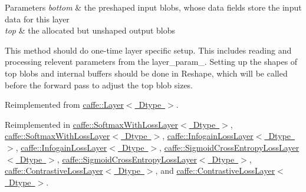 \begin{DoxyParams}{Parameters}
{\em bottom} & the preshaped input blobs, whose data fields store the input data for this layer \\
\hline
{\em top} & the allocated but unshaped output blobs\\
\hline
\end{DoxyParams}
This method should do one-\/time layer specific setup. This includes reading and processing relevent parameters from the {\ttfamily layer\+\_\+param\+\_\+}. Setting up the shapes of top blobs and internal buffers should be done in {\ttfamily Reshape}, which will be called before the forward pass to adjust the top blob sizes. 

Reimplemented from \mbox{\hyperlink{classcaffe_1_1_layer_a481323a3e0972c682787f2137468c29f}{caffe\+::\+Layer$<$ Dtype $>$}}.



Reimplemented in \mbox{\hyperlink{classcaffe_1_1_softmax_with_loss_layer_a96cd04896d4b805fcaf36c2c6522ae10}{caffe\+::\+Softmax\+With\+Loss\+Layer$<$ Dtype $>$}}, \mbox{\hyperlink{classcaffe_1_1_softmax_with_loss_layer_a2a3985570178431a4cc3f9b9fd4378c2}{caffe\+::\+Softmax\+With\+Loss\+Layer$<$ Dtype $>$}}, \mbox{\hyperlink{classcaffe_1_1_infogain_loss_layer_a772be3f4074c72b3cf9214bda3422402}{caffe\+::\+Infogain\+Loss\+Layer$<$ Dtype $>$}}, \mbox{\hyperlink{classcaffe_1_1_infogain_loss_layer_ae59c01de80f22c87c1dd2ef87c6e6a2f}{caffe\+::\+Infogain\+Loss\+Layer$<$ Dtype $>$}}, \mbox{\hyperlink{classcaffe_1_1_sigmoid_cross_entropy_loss_layer_aa1535140dd4eb94557c3afc89076d56d}{caffe\+::\+Sigmoid\+Cross\+Entropy\+Loss\+Layer$<$ Dtype $>$}}, \mbox{\hyperlink{classcaffe_1_1_sigmoid_cross_entropy_loss_layer_ac67af0cc1033db08d47a3f56aff5d600}{caffe\+::\+Sigmoid\+Cross\+Entropy\+Loss\+Layer$<$ Dtype $>$}}, \mbox{\hyperlink{classcaffe_1_1_contrastive_loss_layer_a943e67e7bb9c2362ec20ce44c777beac}{caffe\+::\+Contrastive\+Loss\+Layer$<$ Dtype $>$}}, and \mbox{\hyperlink{classcaffe_1_1_contrastive_loss_layer_a957623c05cb2289cd2ae9e9e93b48969}{caffe\+::\+Contrastive\+Loss\+Layer$<$ Dtype $>$}}.

\mbox{\label{classcaffe_1_1_loss_layer_aa6fc7c2e90be66f1c1f0683637c949da}} 

